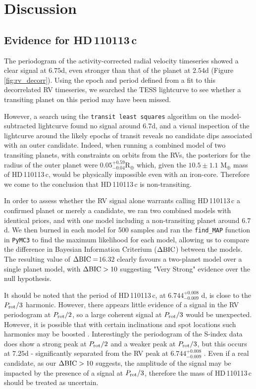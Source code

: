 \documentclass[fleqn,usenatbib]{mnras}
\newcommand{\rearth}{R$_{\oplus}$}
\newcommand{\mearth}{M$_{\oplus}$}
\newcommand{\TPone}{ $ 6.744^{+0.008}_{-0.009} $ }
\newcommand{\TMpone}{ $ 10.5 \pm 1.1 $ }
\newcommand{\Tplanetc}{HD\,110113\,c}
\newcommand{\TdeltaBIC}{$16.32$}
\begin{document}
\section{Discussion}\label{sect:discus}

\subsection{Evidence for \Tplanetc{}}\label{sect:planetc}
The periodogram of the activity-corrected radial velocity timeseries showed a clear signal at $6.75$d, even stronger than that of the planet at $2.54$d (Figure \ref{fig:rv_decorr}).
Using the epoch and period defined from a fit to this decorrelated RV timeseries, we searched the TESS lightcurve to see whether a transiting planet on this period may have been missed.

However, a search using the \texttt{transit least squares} algorithm \citep{hippke2019optimized} on the model-subtracted lightcurve found no signal around 6.7d, and a visual inspection of the lightcurve around the likely epochs of transit reveals no candidate dips associated with an outer candidate.
Indeed, when running a combined model of two transiting planets, with constraints on orbits from the RVs, the posteriors for the radius of the outer planet were $0.05^{+0.59}_{−0.04}$\rearth{} which, given the \TMpone{}\mearth{} mass of \Tplanetc{}, would be physically impossible even with an iron-core.
Therefore we come to the conclusion that \Tplanetc{} is non-transiting.

In order to assess whether the RV signal alone warrants calling \Tplanetc{} a confirmed planet or merely a candidate, we ran two combined models with identical priors, and with one model including a non-transiting planet around $6.7$d.
We then burned in each model for 500 samples and ran the \texttt{find\_MAP} function in \texttt{PyMC3} to find the maximum likelihood for each model, allowing us to compare the difference in Bayesian Information Criterium ($\Delta{\rm BIC}$) between the models.
The resulting value of $\Delta{\rm BIC}= $\TdeltaBIC{} clearly favours a two-planet model over a single planet model, with $\Delta{\rm BIC}>10$ suggesting "Very Strong" evidence over the null hypothesis. 

It should be noted that the period of \Tplanetc{}, at \TPone{}d, is close to the $P_{\rm rot}/3$ harmonic.
However, there appears little evidence of a signal in the RV periodogram at $P_{\rm rot}/2$, so a large coherent signal at $P_{\rm rot}/3$ would be unexpected.
However, it is possible that with certain inclinations and spot locations such harmonics may be boosted \citep{vanderburg2016radial,boisse2011disentangling}.
Interestingly the periodogram of the S-index data does show a strong peak at $P_{\rm rot}/2$ and a weaker peak at $P_{\rm rot}/3$, but this occurs at $7.25$d - significantly separated from the RV peak at \TPone{}.
Even if a real candidate, as our $\Delta{\rm BIC}>10$ suggests, the amplitude of the signal may be impacted by the presence of a signal at $P_{\rm rot}/3$, therefore the mass of \Tplanetc{} should be treated as uncertain. 
\end{document}
